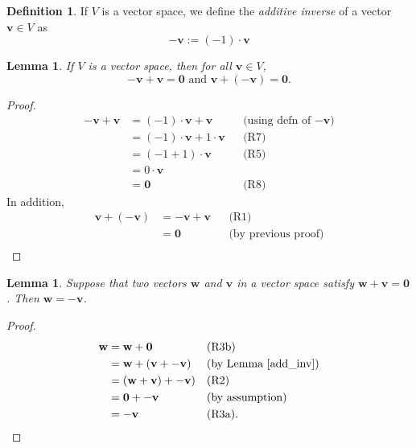 \documentclass[a4paper,11pt]{book}
\newtheorem{lemma}[theorem]{Lemma}
\theoremstyle{definition}
\newtheorem{definition}[theorem]{Definition}
\newcommand{\be}{\begin{equation}}
\newcommand{\ee}{\end{equation}}
\newcommand{\ve}[1]{\mathbf{#1}}
\begin{document}
\begin{definition} If $V$ is a vector space, we define the {\em additive inverse} of a vector $\ve{v} \in V$ as
\[
 - \ve{v} := (-1) \cdot \ve{v}
\]
\end{definition}

\begin{lemma} If $V$ is a vector space, then for all $\ve{v} \in V$, \label{add_inv}
\be
-\ve{v} + \ve{v} = \ve{0} \mbox{ and } \ve{v} + (-\ve{v}) = \ve{0}.
\ee
\end{lemma}
\begin{proof}
\begin{align*}
	-\ve{v} + \ve{v} &= (-1) \cdot \ve{v} + \ve{v} && \mbox{(using defn of $- \ve{v}$)} \\
	&= (-1) \cdot \ve{v} + 1 \cdot \ve{v} && \mbox{(R7)} \\
	& = (-1 + 1) \cdot \ve{v} && \mbox{(R5)} \\
	&= 0 \cdot \ve{v} \\
	&= \ve{0} && \mbox{(R8)}
\end{align*}
In addition,
\begin{align*}
	\ve{v} + (-\ve{v}) &= -\ve{v} + \ve{v} && \mbox{(R1)} \\
	& = \ve{0} && \mbox{(by previous proof)} \\
\end{align*}
\end{proof}

\begin{lemma} Suppose that two vectors $\ve{w}$ and $\ve{v}$ in a vector space satisfy $\ve{w} + \ve{v} = \ve{0}$. Then $\ve{w} = -\ve{v}$.
\end{lemma}
\begin{proof}
\begin{align*}
	\ve{w} &= \ve{w} + \ve{0} && \mbox{(R3b)} \\
	&= \ve{w} + (\ve{v} + -\ve{v}) && \mbox{(by Lemma \ref{add_inv})} \\ 
	&= (\ve{w} + \ve{v}) + -\ve{v}) && \mbox{(R2)} \\ 
	&= \ve{0} + -\ve{v} && \mbox{(by assumption)} \\
	&= -\ve{v} && \mbox{(R3a)}.	
\end{align*}
\end{proof}
\end{document}
